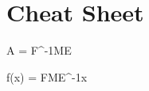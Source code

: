 \chapter{Cheat Sheet}

  \begin{eqbox}
    A = F^{-1}ME
  \end{eqbox}
  \begin{eqbox}
    f(x) = FME^{-1}x
  \end{eqbox}
